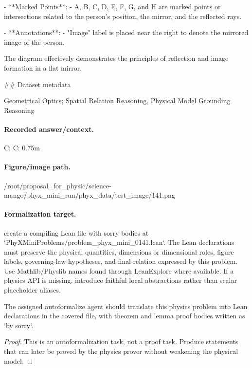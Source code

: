 - **Marked Points**:
  - A, B, C, D, E, F, G, and H are marked points or intersections related to the person's position, the mirror, and the reflected rays.

- **Annotations**:
  - "Image" label is placed near the right to denote the mirrored image of the person.

The diagram effectively demonstrates the principles of reflection and image formation in a flat mirror.

\#\# Dataset metadata

Geometrical Optics; Spatial Relation Reasoning, Physical Model Grounding Reasoning

\paragraph{Recorded answer/context.}
C: C: 0.75m

\paragraph{Figure/image path.}
/root/proposal\_for\_physic/science-mango/phyx\_mini\_run/phyx\_data/test\_image/141.png

\paragraph{Formalization target.}
create a compiling Lean file with sorry bodies at `PhyXMiniProblems/problem\_phyx\_mini\_0141.lean`. The Lean declarations must preserve the physical quantities, dimensions or dimensional roles, figure labels, governing-law hypotheses, and final relation expressed by this problem.
Use Mathlib/Physlib names found through LeanExplore where available. If a physics API is missing, introduce faithful local abstractions rather than scalar placeholder aliases.

\begin{theorem}
\label{thm:physics:phyx_mini_0141:target}
The assigned autoformalize agent should translate this physics problem into Lean declarations in the covered file, with theorem and lemma proof bodies written as `by sorry`.
\end{theorem}
\begin{proof}
This is an autoformalization task, not a proof task. Produce statements that can later be proved by the physics prover without weakening the physical model.
\end{proof}

